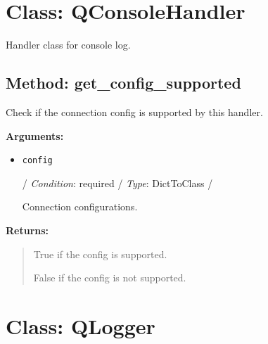 \hypertarget{qconnectbase-qlogger-class-qconsolehandler-51}{%
\section{Class: QConsoleHandler}\label{qconnectbase-qlogger-class-qconsolehandler-51}}

\begin{Shaded}
\begin{Highlighting}[]
\end{Highlighting}
\end{Shaded}

Handler class for console log.

\hypertarget{qconnectbase-qlogger-method-get_config_supported-2-52}{%
\subsection{Method:
get\_config\_supported}\label{qconnectbase-qlogger-method-get_config_supported-2-52}}

Check if the connection config is supported by this handler.

\textbf{Arguments:}

\begin{itemize}
\item
  \texttt{config}

  / \emph{Condition}: required / \emph{Type}: DictToClass /

  Connection configurations.
\end{itemize}

\textbf{Returns:}

\begin{quote}
True if the config is supported.

False if the config is not supported.
\end{quote}

\hypertarget{qconnectbase-qlogger-class-qlogger-53}{%
\section{Class: QLogger}\label{qconnectbase-qlogger-class-qlogger-53}}

\begin{Shaded}
\begin{Highlighting}[]
\end{Highlighting}
\end{Shaded}

